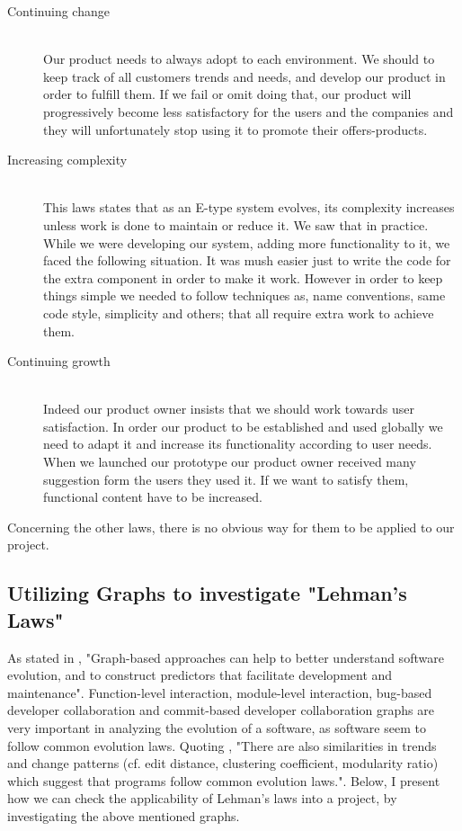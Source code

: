\begin{description}
	\item[Continuing change] \hfill \\Our product needs to always adopt to each environment. We should to keep track of all customers trends and needs, and develop our product in order to fulfill them. If we fail or omit doing that, our product will progressively become less satisfactory for the users and the companies and they will unfortunately stop using it to promote their offers-products.
	\item[Increasing complexity] \hfill \\This laws states that as an E-type system evolves, its complexity increases unless work is done to maintain or reduce it. We saw that in practice. While we were developing our system, adding more functionality to it, we faced the following situation. It was mush easier just to write the code for the extra component in order to make it work. However in order to keep things simple we needed to follow techniques as, name conventions, same code style, simplicity and others; that all require extra work to achieve them.
	\item[Continuing growth] \hfill \\Indeed our product owner insists that we should work towards user satisfaction. In order our product to be established and used globally we need to adapt it and increase its functionality according to user needs. When we launched our prototype our product owner received many suggestion form the users they used it. If we want to  satisfy them, functional content have to be increased.
\end{description} 
Concerning the other laws, there is no obvious way for them to be applied to our project.

\subsection{Utilizing Graphs to investigate "Lehman's Laws"}
As stated in \cite{GraphBased}, "Graph-based approaches can help to better understand software evolution, and to construct predictors that facilitate development and maintenance". Function-level interaction, module-level interaction, bug-based developer collaboration and commit-based developer collaboration graphs are very important in analyzing the evolution of a software, as software seem to follow common evolution laws. Quoting \cite{GraphBased}, "There are also similarities in trends and change patterns (cf. edit distance, clustering coefficient, modularity ratio) which suggest that programs follow common evolution laws.". Below, I present how we can check the applicability of Lehman's laws into a project, by investigating the above mentioned graphs. 

